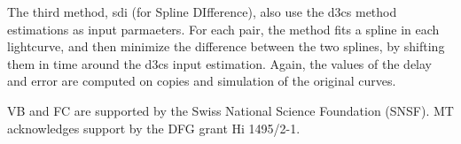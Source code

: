 \documentclass[traditabstract]{aa}
\begin{document}
The third method, sdi (for Spline DIfference), also use the d3cs method estimations as input parmaeters. For each pair, the method fits a spline in each lightcurve, and then minimize the difference between the two splines, by shifting them in time around the d3cs input estimation. Again, the values of the delay and error are computed on copies and simulation of the original curves.




\begin{acknowledgements}
VB and FC are supported by the Swiss National Science Foundation (SNSF). MT acknowledges support by the DFG grant Hi 1495/2-1.
\end{acknowledgements}





\end{document}
